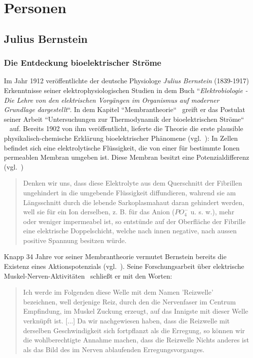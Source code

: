 \chapter{Personen}

\section{Julius Bernstein}\label{appendix:bernstein}

\subsection*{Die Entdeckung bioelektrischer Ströme}

Im Jahr 1912 veröffentlichte der deutsche Physiologe \textit{Julius Bernstein} (1839-1917) Erkenntnisse seiner elektrophysiologischen Studien in dem Buch ``\textit{Elektrobiologie - Die Lehre von den elektrischen Vorgängen im Organismus auf moderner Grundlage dargestellt}``.
In dem Kapitel ``Membrantheorie``~\cite{Ber12} greift er das Postulat seiner Arbeit ``Untersuchungen zur Thermodynamik der bioelektrischen Ströme`` ~\cite{Ber02} auf.
Bereits 1902 von ihm veröffentlicht, lieferte die Theorie die erste plausible physikalisch-chemische Erklärung bioelektrischer Phänomene (vgl.~\cite[5]{Sey06}):
In Zellen befindet sich eine elektrolytische Flüssigkeit, die von einer für bestimmte Ionen permeablen Membran umgeben ist. Diese Membran besitzt eine Potenzialdifferenz (vgl.~\cite[92 f.]{Ber12})

\blockquote[{\cite[542]{Ber02}}]{
    Denken wir uns, dass diese Elektrolyte aus dem Querschnitt der Fibrillen ungehindert in die umgebende Flüssigkeit diffundieren, wahrend sie am Längsschnitt durch die lebende Sarkoplasmahaut daran gehindert werden, well sie für ein Ion derselben, z. B. für das Anion ($PO^-_4$ u. s. w.), mehr oder weniger impermeabel ist, so entstünde auf der Oberfläche der Fibrille eine elektrische Doppelschicht, welche nach innen negative, nach aussen positive Spannung besitzen würde.
}

Knapp 34 Jahre vor seiner Membrantheorie vermutet Bernstein bereits die Existenz eines Aktionspotenzials (vgl.~\cite[168]{Sch83}). Seine Forschungsarbeit über elektrische Muskel-Nerven-Aktivitäten~\cite{Ber68} schließt er mit den Worten:

\blockquote[{\cite[198 f.]{Ber68}}]{
    Ich werde im Folgenden diese Welle mit dem Namen 'Reizwelle' bezeichnen, well derjenige Reiz, durch den die Nervenfaser im Centrum Empfindung, im Muskel Zuckung erzeugt, auf das  Innigste mit dieser Welle verknüpft ist. {[...]} Da wir nachgewiesen haben, dass die Reizwelle mit derselben Geschwindigkeit sich fortpflanzt als die Erregung, so können wir die wohlberechtigte Annahme machen, dass die Reizwelle Nichts anderes ist als das Bild des im Nerven ablaufenden Erregungsvorganges.
}

